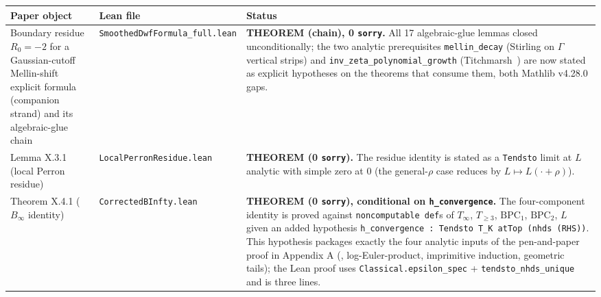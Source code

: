 {\def\LTcaptype{none} %
\begin{longtable}[]{@{}
  >{\raggedright\arraybackslash}p{}
  >{\raggedright\arraybackslash}p{}
  >{\raggedright\arraybackslash}p{}@{}}
\toprule\noalign{}
\begin{minipage}[b]{\linewidth}\raggedright
Paper object
\end{minipage} & \begin{minipage}[b]{\linewidth}\raggedright
Lean file
\end{minipage} & \begin{minipage}[b]{\linewidth}\raggedright
Status
\end{minipage} \\
\midrule\noalign{}
\endhead
\bottomrule\noalign{}
\endlastfoot
Boundary residue \(R_0 = -2\) for a Gaussian-cutoff Mellin-shift explicit formula (companion strand) and its algebraic-glue chain & \texttt{SmoothedDwfFormula\_full.lean} & \textbf{THEOREM (chain), 0 \texttt{sorry}.} All 17 algebraic-glue lemmas closed unconditionally; the two analytic prerequisites \texttt{mellin\_decay} (Stirling on \(\Gamma\) vertical strips) and \texttt{inv\_zeta\_polynomial\_growth} (Titchmarsh~\cite[\S\,3.11]{Titchmarsh1986RZF}) are now stated as explicit hypotheses on the theorems that consume them, both Mathlib v4.28.0 gaps. \\
Lemma X.3.1 (local Perron residue) & \texttt{LocalPerronResidue.lean} & \textbf{THEOREM (0 \texttt{sorry}).} The residue identity is stated as a \texttt{Tendsto} limit at \(L\) analytic with simple zero at \(0\) (the general-\(\rho\) case reduces by \(L \mapsto L(\cdot + \rho)\)). \\
Theorem X.4.1 (\(B_\infty\) identity) & \texttt{CorrectedBInfty.lean} & \textbf{THEOREM (0 \texttt{sorry}), conditional on \texttt{h\_convergence}.} The four-component identity is proved against \texttt{noncomputable\ def}s of \(T_\infty\), \(T_{\ge 3}\), \(\mathrm{BPC}_1\), \(\mathrm{BPC}_2\), \(L\) given an added hypothesis \texttt{h\_convergence\ :\ Tendsto\ T\_K\ atTop\ (nhds\ (RHS))}. This hypothesis packages exactly the four analytic inputs of the pen-and-paper proof in Appendix A (\cite{AkatsukaH2013EulerProduct}, log-Euler-product, imprimitive induction, geometric tails); the Lean proof uses \texttt{Classical.epsilon\_spec} + \texttt{tendsto\_nhds\_unique} and is three lines. \\

\end{longtable}}
